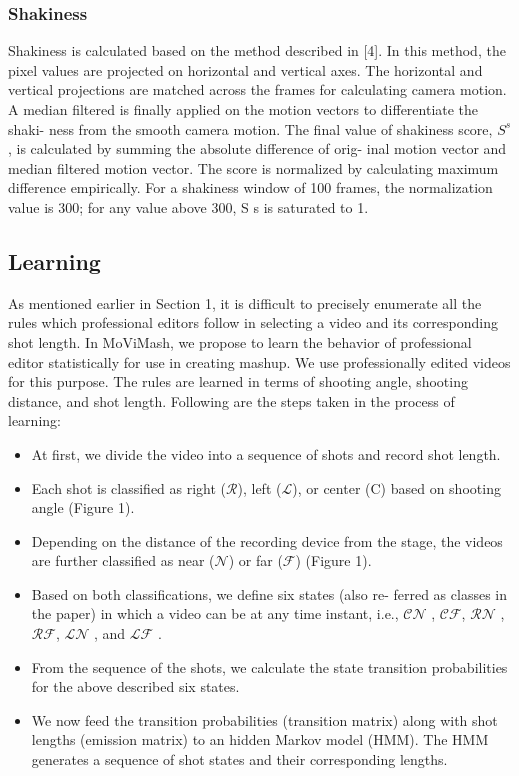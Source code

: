 \documentclass{sig-alternate}
\begin{document}
\subsubsection{Shakiness}
Shakiness is calculated based on the method described in [4].
In this method, the pixel values are projected on horizontal and
vertical axes. The horizontal and vertical projections are matched
across the frames for calculating camera motion. A median filtered
is finally applied on the motion vectors to differentiate the shaki-
ness from the smooth camera motion. The final value of shakiness
score, $S^s$ , is calculated by summing the absolute difference of orig-
inal motion vector and median filtered motion vector. The score is
normalized by calculating maximum difference empirically. For a
shakiness window of 100 frames, the normalization value is 300;
for any value above 300, S s is saturated to 1.\\


\subsection{Learning}
As mentioned earlier in Section 1, it is difficult to precisely enumerate all the rules which professional editors follow in selecting
a video and its corresponding shot length. In MoViMash, we propose to learn the behavior of professional editor statistically for use
in creating mashup. We use professionally edited videos for this purpose. The rules are learned in terms of shooting angle, shooting distance, and shot length. Following are the steps taken in the
process of learning:\\

\begin{itemize}
  \item  At first, we divide the video into a sequence of shots and
record shot length.
\item Each shot is classified as right ($\mathcal{R}$), left ($\mathcal{L}$), or center (C)
based on shooting angle (Figure 1).

\item  Depending on the distance of the recording device from the
stage, the videos are further classified as near ($\mathcal{N}$) or far ($\mathcal{F}$)
(Figure 1).

\item  Based on both classifications, we define six states (also re-
ferred as classes in the paper) in which a video can be at any
time instant, i.e., $\mathcal{CN}$ , $\mathcal{CF}$, $\mathcal{RN}$ , $\mathcal{RF}$, $\mathcal{LN}$ , and $\mathcal{LF}$ .

\item  From the sequence of the shots, we calculate the state transition probabilities for the above described six states.

\item We now feed the transition probabilities (transition matrix)
along with shot lengths (emission matrix) to an hidden Markov
model (HMM). The HMM generates a sequence of shot states
and their corresponding lengths.

\end{itemize}
\end{document}
